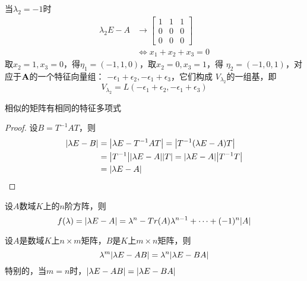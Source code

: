 \documentclass[11pt]{article}
\begin{document}
\begin{examplle}[]
\begin{enumerate}
当\(\lambda_2=-1\)时
\begin{align*}
\lambda_2 E-A&\to
\begin{bmatrix}
1&1&1\\0&0&0\\0&0&0
\end{bmatrix}\\
&\Leftrightarrow
x_1+x_2+x_3=0
\end{align*}
取\(x_2=1,x_3=0\)，得\(\eta_1=(-1,1,0)\)，取\(x_2=0,x_3=1\)，得
\(\eta_2=(-1,0,1)\)，对应于\(\operatorname{\textbf{A}}\)的一个特征向量组：
\(-\epsilon_1+\epsilon_2,-\epsilon_1+\epsilon_3\)，它们构成
\(V_{\lambda_2}\)的一组基，即
\begin{equation*}
V_{\lambda_2}=L(-\epsilon_1+\epsilon_2,-\epsilon_1+\epsilon_3)
\end{equation*}
\end{enumerate}
\end{examplle}


\begin{proposition}[]
相似的矩阵有相同的特征多项式
\end{proposition}

\begin{proof}
设\(B=T^{-1}AT\)，则
\begin{align*}
\abs{\lambda E-B}&=\abs{\lambda E-T^{-1}AT}=\abs{T^{-1}(\lambda E-A)T}\\
&=\abs{T^{-1}}\abs{\lambda E-A}\abs{T}=\abs{\lambda E-A}\abs{T^{-1}T}\\
&=\abs{\lambda E-A}
\end{align*}
\end{proof}

\begin{proposition}[]
设\(A\)数域\(K\)上的\(n\)阶方阵，则
\begin{equation*}
f(\lambda)=\abs{\lambda E-A}=
\lambda^n-Tr(A)\lambda^{n-1}+\dots+(-1)^n\abs{A}
\end{equation*}
\end{proposition}

\begin{proposition}[]
设\(A\)是数域\(K\)上\(n\times m\)矩阵，\(B\)是\(K\)上\(m\times n\)矩阵，则
\begin{equation*}
\lambda^m\abs{\lambda E-AB}=\lambda^n\abs{\lambda E-BA}
\end{equation*}
特别的，当\(m=n\)时，\(\abs{\lambda E-AB}=\abs{\lambda E-BA}\)
\end{proposition}
\end{document}
